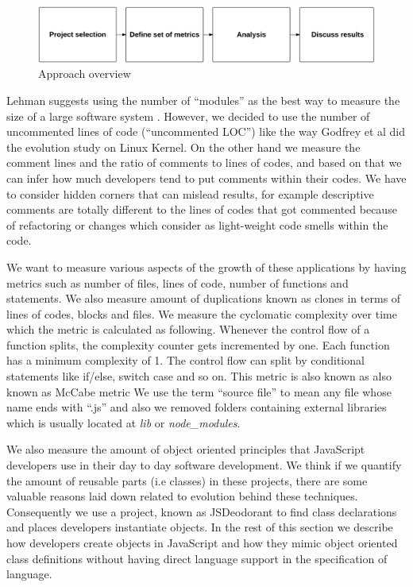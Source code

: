  \begin{figure}[thb!]
 	\caption{Approach overview}
 	\centering
 	\label{fig:approach_overview}
 	\includegraphics[width=1\textwidth]{figures/approach_overview}
 \end{figure}

Lehman suggests using the number of “modules” as the best way to measure the size of a large software system \cite{Lehman1997METRICS}. However, we decided to use the number of uncommented lines of code (“uncommented LOC”) like the way Godfrey et al \cite{Godfrey2000ICMS} did the evolution study on Linux Kernel. On the other hand we measure the comment lines and the ratio of comments to lines of codes, and based on that we can infer how much developers tend to put comments within their codes. We have to consider hidden corners that can mislead results, for example descriptive comments are totally different to the lines of codes that got commented because of refactoring or changes which consider as light-weight code smells within the code.

We want to measure various aspects of the growth of these applications by having metrics such as number of files, lines of code, number of functions and statements. We also measure amount of duplications known as clones in terms of lines of codes, blocks and files. We measure the cyclomatic complexity over time which the metric is calculated as following. Whenever the control flow of a function splits, the complexity counter gets incremented by one. Each function has a minimum complexity of 1. The control flow can split by conditional statements like if/else, switch case and so on. This metric is also known as also known as McCabe metric
We use the term “source file” to mean any file whose name ends with “.js” and also we removed folders containing external libraries which is usually located at \textit{lib} or \textit{node\_modules}. 

We also measure the amount of object oriented principles that JavaScript developers use in their day to day software development. We think if we quantify the amount of reusable parts (i.e classes) in these projects, there are some valuable reasons laid down related to evolution behind these techniques. Consequently we use a project, known as JSDeodorant to find class declarations and places developers instantiate objects.
In the rest of this section we describe how developers create objects in JavaScript and how they mimic object oriented class definitions without having direct language support in the specification of language.


